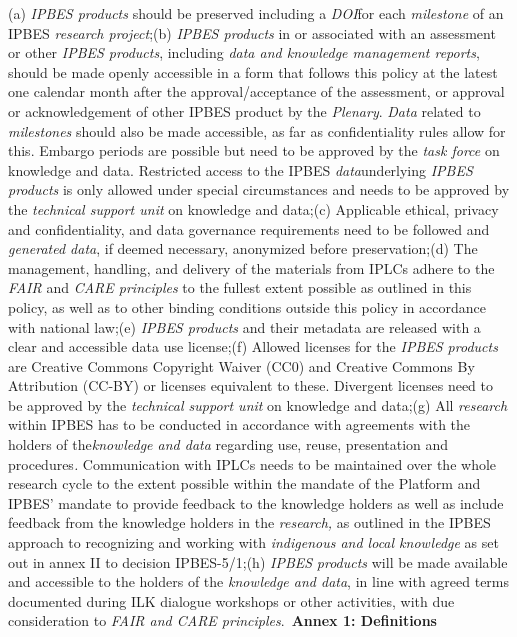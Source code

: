 \documentclass{article}
\begin{document}
(a) \textit{IPBES products} should be preserved including a \textit{DOI}for each \textit{milestone }of an IPBES \textit{research project};(b) \textit{IPBES products} in or associated with an assessment or other \textit{IPBES products}, including \textit{data and knowledge management reports}, should be made openly accessible in a form that follows this policy at the latest one calendar month after the approval/acceptance of the assessment, or approval or acknowledgement of other IPBES product by the \textit{Plenary}. \textit{Data} related to \textit{milestones }should also be made accessible, as far as confidentiality rules allow for this. Embargo periods are possible but need to be approved by the \textit{task force }on knowledge and data. Restricted access to the IPBES \textit{data}underlying \textit{IPBES products} is only allowed under special circumstances and needs to be approved by the \textit{technical support unit }on knowledge and data;(c) Applicable ethical, privacy and confidentiality, and data governance requirements need to be followed and \textit{generated data}, if deemed necessary, anonymized before preservation;(d) The management, handling, and delivery of the materials from IPLCs adhere to the \textit{FAIR }and \textit{CARE principles} to the fullest extent possible as outlined in this policy, as well as to other binding conditions outside this policy in accordance with national law;(e) \textit{IPBES products} and their metadata are released with a clear and accessible data use license;(f) Allowed licenses for the \textit{IPBES products} are Creative Commons Copyright Waiver (CC0) and Creative Commons By Attribution (CC-BY) or licenses equivalent to these. Divergent licenses need to be approved by the \textit{technical support unit} on knowledge and data;(g) All \textit{research} within IPBES has to be conducted in accordance with agreements with the holders of the\textit{knowledge and data }regarding use, reuse, presentation and procedures\textit{.} Communication with IPLCs needs to be maintained over the whole research cycle to the extent possible within the mandate of the Platform and IPBES’ mandate to provide feedback to the knowledge holders as well as include feedback from the knowledge holders in the \textit{research, }as outlined in the IPBES approach to recognizing and working with \textit{indigenous and local knowledge} as set out in annex II to decision IPBES-5/1;(h) \textit{IPBES} \textit{products} will be made available and accessible to the holders of the \textit{knowledge and data}, in line with agreed terms documented during ILK dialogue workshops or other activities, with due consideration to \textit{FAIR and CARE principles}. \textbf{Annex 1: Definitions}
\end{document}
